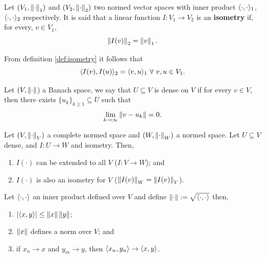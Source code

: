 \documentclass[../TGMAFFIRO]{subfiles}
\begin{document}
\begin{definition}\label{def:isometry}
	Let $(V_1, \left\lVert\cdot\right\rVert_1)$ and $(V_2, \left\lVert\cdot\right\rVert_2)$ two normed vector spaces with inner product $\langle \cdot, \cdot\rangle_1$, $\langle \cdot, \cdot\rangle_2$ respectively. It is said that a linear function $I:V_1\to V_2$ is an \textbf{isometry} if, for every, $v\in V_1$,
	\begin{equation}
		\left\lVert I(v)\right\rVert_2  = \left\lVert v\right\rVert_1.
	\end{equation}
\end{definition}

\begin{remark}
	From definition \ref{def:isometry} it follows that
	\begin{equation}
		\innerprod{I(v)}{I(u)}_2 = \innerprod{v}{u}_1 \ \forall \ v,u\in V_1.
	\end{equation}
\end{remark}

\begin{definition}
	Let $(V, \left\lVert\cdot\right\rVert$) a Banach space, we say that $U \subseteq V$ is dense on $V$ if for every $v\in V$, then there exists $\{u_k\}_{k\geq 1} \subseteq U$ such that 
	\begin{equation}
		\lim_{k\to\infty} \left\lVert v - u_k\right\rVert = 0.
	\end{equation}

\end{definition}

\begin{proposition}
	Let $(V, \left\lVert\cdot\right\rVert_V)$ a complete normed space and $(W, \left\lVert\cdot\right\rVert_W)$ a normed space. Let $U\subseteq V$ dense, and $I:U\to W$ and isometry. Then,
	\begin{enumerate}
		\item $I(\cdot)$ can be extended to all $V$ ($I: V\to W$); and
		\item $I(\cdot)$ is also an isometry for $V$ ($\left\lVert I(v)\right\rVert_W = \left\lVert I(v)\right\rVert_V$).
	\end{enumerate}
\end{proposition}

\begin{proposition}\label{def:hilbert_space}
	Let $\langle \cdot, \cdot\rangle$	 an inner product defined over $V$ and define $\left\lVert\cdot\right\rVert:=\sqrt{\langle \cdot, \cdot\rangle}$ then,
	\begin{enumerate}
		\item $|\langle x, y\rangle| \leq \left\lVert x\right\rVert \left\lVert y\right\rVert$;
		\item $\left\lVert x\right\rVert$ defines a norm over $V$; and
		\item if $x_n \to x$ and $y_m \to y$, then $\langle x_n, y_n\rangle \to \langle x, y\rangle$.
	\end{enumerate}
\end{proposition}
\end{document}
